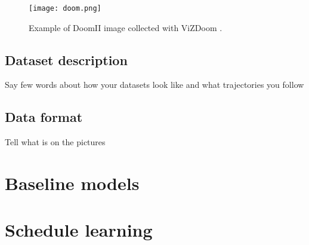 \begin{figure}
\centering
\texttt{[image: doom.png]} %
\caption{Example of DoomII image collected with ViZDoom \cite{Kempka2016}.}
\label{fig:doom}
\end{figure}

\subsection{Dataset description}

Say few words about how your datasets look like and what trajectories you follow

\subsection{Data format}

Tell what is on the pictures

\section{Baseline models}
\section{Schedule learning}
